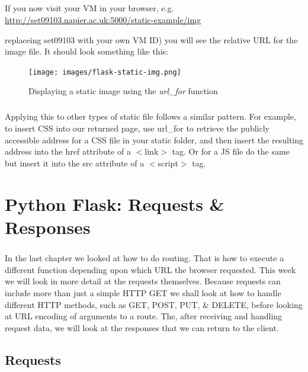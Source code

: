 \documentclass[12pt, a4paper, oneside]{book}
\begin{document}
\paragraph{} If you now visit your VM in your browser, e.g. \url{http://set09103.napier.ac.uk:5000/static-example/img} {replaceing set09103 with your own VM ID) you will see the relative URL for the image file. It should look something like this:

\begin{figure}[H]
\centering
\texttt{[image: images/flask-static-img.png]}
\caption{Displaying a static image using the \emph{url\_for} function}
\label{fig:flask-static-img}
\end{figure}

\paragraph{} Applying this to other types of static file follows a similar pattern. For example, to insert CSS into our returned page, use url\_for to retrieve the publicly accessible address for a CSS file in your static folder, and then insert the resulting address into the href attribute of a $<$link$>$ tag. Or for a JS file do the same but insert it into the src attribute of a $<$script$>$ tag.


\chapter{Python Flask: Requests \& Responses}
\label{lab04}
\paragraph{} In the last chapter we looked at how to do routing. That is how to execute a different function depending upon which URL the browser requested. This week we will look in more detail at the requests themselves. Because requests can include more than just a simple HTTP GET we shall look at how to handle different HTTP methods, such as GET, POST, PUT, \& DELETE, before looking at URL encoding of arguments to a route. The, after receiving and handling request data, we will look at the responses that we can return to the client.


\section{Requests}
\label{requests}
}
\end{document}
